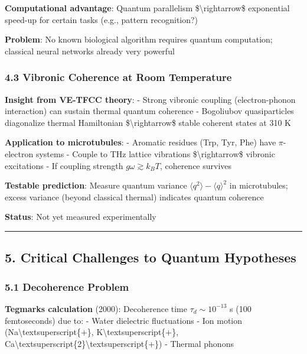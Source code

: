 \textbf{Computational advantage}: Quantum parallelism
\$\textbackslash rightarrow\$ exponential speed-up for certain tasks
(e.g., pattern recognition?)

\textbf{Problem}: No known biological algorithm requires quantum
computation; classical neural networks already very powerful

\subsubsection{4.3 Vibronic Coherence at Room
Temperature}\label{vibronic-coherence-at-room-temperature}

\textbf{Insight from VE-TFCC theory}: - Strong vibronic coupling
(electron-phonon interaction) can sustain thermal quantum coherence -
Bogoliubov quasiparticles diagonalize thermal Hamiltonian
\$\textbackslash rightarrow\$ stable coherent states at 310 K

\textbf{Application to microtubules}: - Aromatic residues (Trp, Tyr,
Phe) have \(\pi\)-electron systems - Couple to THz lattice vibrations
\$\textbackslash rightarrow\$ vibronic excitations - If coupling
strength \(g \omega \gtrsim k_B T\), coherence survives

\textbf{Testable prediction}: Measure quantum variance
\(\langle q^2 \rangle - \langle q \rangle^2\) in microtubules; excess
variance (beyond classical thermal) indicates quantum coherence

\textbf{Status}: Not yet measured experimentally

\begin{center}\rule{0.5\linewidth}{0.5pt}\end{center}

\subsection{5. Critical Challenges to Quantum
Hypotheses}\label{critical-challenges-to-quantum-hypotheses}

\subsubsection{5.1 Decoherence Problem}\label{decoherence-problem}

\textbf{Tegmark\textquotesingle s calculation} (2000): Decoherence time
\(\tau_d \sim 10^{-13}\) s (100 femtoseconds) due to: - Water dielectric
fluctuations - Ion motion (Na\textbackslash textsuperscript\{+\},
K\textbackslash textsuperscript\{+\},
Ca\textbackslash textsuperscript\{2\}\textbackslash textsuperscript\{+\})
- Thermal phonons

